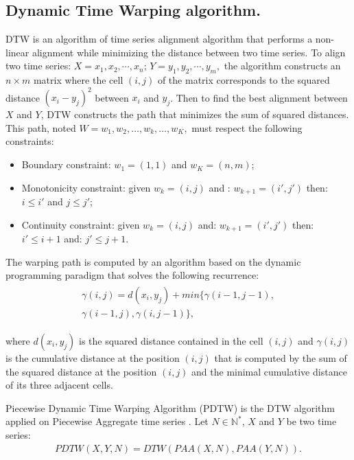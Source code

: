 \subsection{Dynamic Time Warping algorithm.}
DTW \cite{sakoe1978dynamic} is an algorithm of time series alignment
algorithm that  performs a non-linear alignment while
minimizing the distance between two time series. To align two time series: 
$X=x_{1},x_{2},\cdots,x_{n};\,
Y=y_{1},y_{2},\cdots,y_{m},$ the algorithm constructs an  $n\times m$  matrix where the cell $(i,
j)$ of the matrix corresponds to the squared distance $(x_{i}-y_{j})^{2}$ between $x_{i}$
and $y_{j}$. Then to find the best alignment between $X$ and $Y$, DTW constructs the path that minimizes the sum of squared distances. This path, noted
$W = w_1, w_2, \ldots, w_k, \ldots, w_K,$ must respect the following constraints:
\begin{itemize}
  \item Boundary constraint: $w_1 = (1, 1)$ and  $w_K = (n, m)$;
  \item Monotonicity constraint: given $w_k = (i, j)$ and :  $w_{k + 1} =
  (i',j')$ then: $i \leq i'$ and $j \leq j'$;
 \item Continuity constraint: given $w_k = (i, j)$ and:   $w_{k + 1} = (i', j')$
 then: $i' \leq i + 1$ and: $j' \leq j + 1$.
\end{itemize}
The warping path is computed by  an algorithm based on the dynamic
programming paradigm that solves the following recurrence:
\begin{eqnarray}
\begin{array}{l}
\gamma(i,j)=d(x_{i},y_{j}) + min\{\gamma(i-1, j-1), \\
\gamma(i-1, j),\gamma(i, j-1)\},
\end{array}
\end{eqnarray}


where $d(x_{i},y_{j})$ is the squared distance contained in the cell $(i, j)$ and $\gamma(i, j)$ is the cumulative distance at the position $(i, j)$ that is computed by the sum of the squared distance at the position $(i, j)$ and the minimal cumulative distance of its three adjacent cells.


Piecewise Dynamic Time Warping Algorithm (PDTW) \cite{keogh2000scaling} is the DTW algorithm applied on Piecewise Aggregate time series \cite{keogh2001dimensionality}. Let $N\in\mathbb{N^{*}}$, $X$ and $Y$ be two time series:
\begin{eqnarray}
PDTW(X, Y, N) = DTW(PAA(X, N), PAA(Y, N)).
\end{eqnarray}

